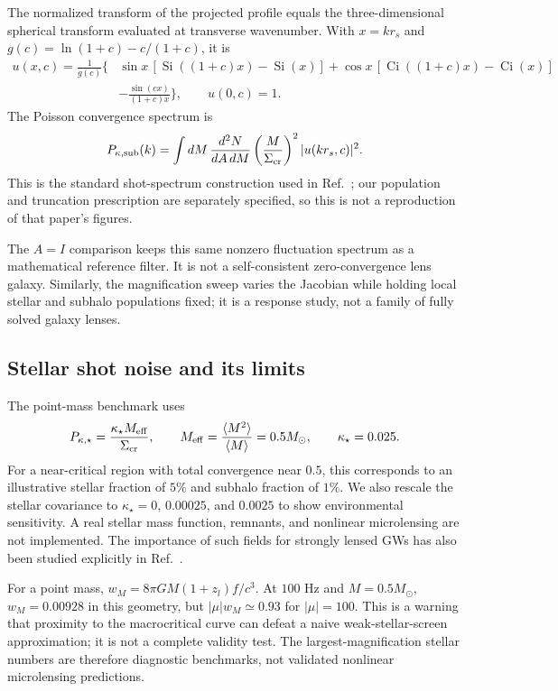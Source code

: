 \documentclass[11pt]{article}
\begin{document}
The normalized transform of the projected profile equals the three-dimensional
spherical transform evaluated at transverse wavenumber. With $x=kr_s$ and
$g(c)=\ln(1+c)-c/(1+c)$, it is
\begin{align}
 u(x,c)=\frac{1}{g(c)}\bigg\{&\sin x\,[\operatorname{Si}((1+c)x)-\operatorname{Si}(x)]
 +\cos x\,[\operatorname{Ci}((1+c)x)-\operatorname{Ci}(x)]\nonumber\\
 &-\frac{\sin(cx)}{(1+c)x}\bigg\},\qquad u(0,c)=1.
\end{align}
The Poisson convergence spectrum is
\begin{equation}
 P_{\kappa,\rm sub}(k)=\int dM\,\frac{d^2N}{dA\,dM}
 \left(\frac{M}{\Sigma_{\rm cr}}\right)^2 |u(kr_s,c)|^2.
 \label{eq:subhalo-power}
\end{equation}
This is the standard shot-spectrum construction used in
Ref.~\cite{oguri2022}; our population and truncation prescription are separately
specified, so this is not a reproduction of that paper's figures.

The $A=I$ comparison keeps this same nonzero fluctuation spectrum as a
mathematical reference filter. It is not a self-consistent zero-convergence
lens galaxy. Similarly, the magnification sweep varies the Jacobian while
holding local stellar and subhalo populations fixed; it is a response study,
not a family of fully solved galaxy lenses.

\subsection{Stellar shot noise and its limits}

The point-mass benchmark uses
\begin{equation}
 P_{\kappa,\star}=\frac{\kappa_\star M_{\rm eff}}{\Sigma_{\rm cr}},\qquad
 M_{\rm eff}=\frac{\langle M^2\rangle}{\langle M\rangle}=0.5M_\odot,
 \qquad\kappa_\star=0.025.
 \label{eq:stellar-power}
\end{equation}
For a near-critical region with total convergence near $0.5$, this corresponds
to an illustrative stellar fraction of $5\%$ and subhalo fraction of $1\%$.
We also rescale the stellar covariance to $\kappa_\star=0$, $0.00025$, and
$0.0025$ to show environmental sensitivity. A real stellar mass function,
remnants, and nonlinear microlensing are not implemented. The importance of
such fields for strongly lensed GWs has also been studied explicitly in
Ref.~\cite{zumalacarregui2026}.

For a point mass, $w_M=8\pi GM(1+z_l)f/c^3$. At $100$ Hz and
$M=0.5M_\odot$, $w_M=0.00928$ in this geometry, but
$|\mu|w_M\simeq0.93$ for $|\mu|=100$.
This is a warning that proximity to the macrocritical curve can defeat a
naive weak-stellar-screen approximation; it is not a complete validity test.
The largest-magnification stellar numbers are therefore diagnostic benchmarks,
not validated nonlinear microlensing predictions.
\end{document}
